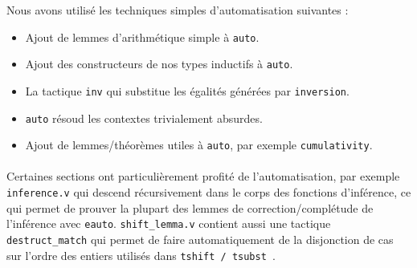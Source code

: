     Nous avons utilisé les techniques simples d'automatisation suivantes :
     \begin{itemize}
     \item Ajout de lemmes d'arithmétique simple à {\tt auto}.
     \item Ajout des constructeurs de nos types inductifs à {\tt auto}.
     \item La tactique {\tt inv} qui substitue les égalités générées par {\tt inversion}.
     \item {\tt auto} résoud les contextes trivialement absurdes.
     \item Ajout de lemmes/théorèmes utiles à {\tt auto}, par exemple {\tt cumulativity}.
     \end{itemize}
     \paragraph{}Certaines sections ont particulièrement profité de l'automatisation, par exemple {\tt inference.v} qui
     descend récursivement dans le corps des fonctions d'inférence, ce qui permet de prouver la plupart des
     lemmes de correction/complétude de l'inférence avec {\tt eauto}. {\tt shift\_lemma.v} contient aussi
     une tactique {\tt destruct\_match} qui permet de faire automatiquement de la disjonction de cas
     sur l'ordre des entiers utilisés dans {\tt tshift / tsubst }.
